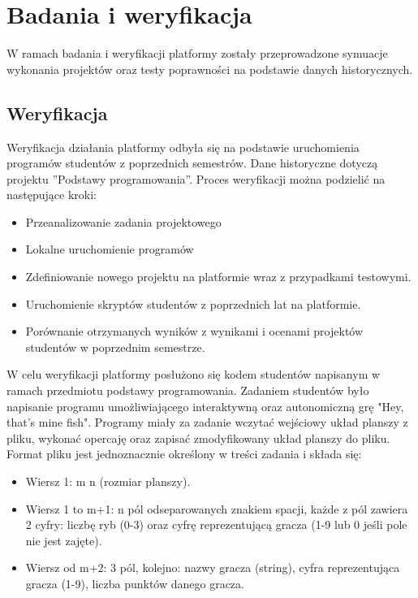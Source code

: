 \chapter{Badania i weryfikacja}
\label{chapter:research}

W ramach badania i weryfikacji platformy zostały przeprowadzone symuacje wykonania projektów oraz testy poprawności na podstawie danych historycznych.

\section{Weryfikacja}

Weryfikacja działania platformy odbyła się na podstawie uruchomienia programów studentów z poprzednich semestrów.
Dane historyczne dotyczą projektu ”Podstawy programowania”.
Proces weryfikacji można podzielić na następujące kroki:
\begin{itemize}
    \item Przeanalizowanie zadania projektowego
    \item Lokalne uruchomienie programów
    \item Zdefiniowanie nowego projektu na platformie wraz z przypadkami testowymi.
    \item Uruchomienie skryptów studentów z poprzednich lat na platformie.
    \item Porównanie otrzymanych wyników z wynikami i ocenami projektów studentów w poprzednim semestrze.
\end{itemize}

W celu weryfikacji platformy posłużono się kodem studentów napisanym w ramach przedmiotu podstawy programowania.
Zadaniem studentów było napisanie programu umożliwiającego interaktywną oraz autonomiczną grę "Hey, that’s mine fish".
Programy miały za zadanie wczytać wejściowy układ planszy z pliku, wykonać opercaję oraz zapisać zmodyfikowany układ planszy do pliku.
Format pliku jest jednoznacznie określony w treści zadania i składa się:
\begin{itemize}
    \item Wiersz 1: m n (rozmiar planszy).
    \item Wiersz 1 to m+1: n pól odseparowanych znakiem spacji, każde z pól zawiera 2 cyfry: liczbę ryb (0-3) oraz cyfrę reprezentującą gracza (1-9 lub 0 jeśli pole nie jest zajęte).
    \item Wiersz od m+2: 3 pól, kolejno: nazwy gracza (string), cyfra reprezentująca gracza (1-9), liczba punktów danego gracza.
\end{itemize}

